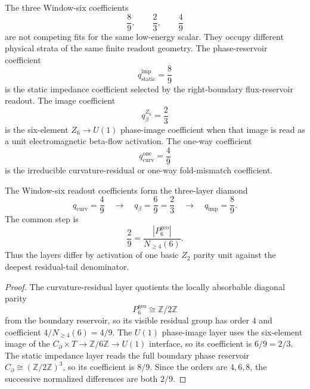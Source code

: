 \begin{principle}
\label{prin:zeckendorf-three-coefficient-strata}
The three Window-six coefficients
$$
  \frac89,\qquad \frac23,\qquad \frac49
$$
are not competing fits for the same low-energy scalar. They occupy
different physical strata of the same finite readout geometry. The
phase-reservoir coefficient
$$
  q_{\mathrm{static}}^{\mathrm{imp}}=\frac89
$$
is the static impedance coefficient selected by the right-boundary
flux-reservoir readout. The image coefficient
$$
  q_{\beta}^{Z_6}=\frac23
$$
is the six-element $Z_6\to U(1)$ phase-image coefficient when that image
is read as a unit electromagnetic beta-flow activation. The one-way
coefficient
$$
  q_{\mathrm{curv}}^{\mathrm{one}}=\frac49
$$
is the irreducible curvature-residual or one-way fold-mismatch
coefficient.
\end{principle}

\begin{theorem}
\label{thm:zeckendorf-window-six-readout-diamond}
The Window-six readout coefficients form the three-layer diamond
$$
  q_{\mathrm{curv}}
  =
  \frac49
  \quad\longrightarrow\quad
  q_{\beta}
  =
  \frac69
  =
  \frac23
  \quad\longrightarrow\quad
  q_{\mathrm{imp}}
  =
  \frac89.
$$
The common step is
$$
  \frac29
  =
  \frac{|P_6^{\mathrm{geo}}|}{N_{\geq4}(6)}.
$$
Thus the layers differ by activation of one basic $Z_2$ parity unit
against the deepest residual-tail denominator.
\end{theorem}
\begin{proof}
The curvature-residual layer quotients the locally absorbable diagonal
parity
$$
  P_6^{\mathrm{geo}}\cong\mathbb{Z}/2\mathbb{Z}
$$
from the boundary reservoir, so its visible residual group has order
$4$ and coefficient $4/N_{\geq4}(6)=4/9$. The $U(1)$ phase-image layer
uses the six-element image of the
$C_\partial\times T\to\mathbb{Z}/6\mathbb{Z}\to U(1)$ interface, so its
coefficient is $6/9=2/3$. The static impedance layer reads the full
boundary phase reservoir $C_\partial\cong(\mathbb{Z}/2\mathbb{Z})^3$,
so its coefficient is $8/9$. Since the orders are $4,6,8$, the
successive normalized differences are both $2/9$.
\end{proof}

